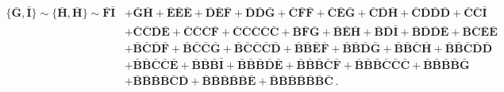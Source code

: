 \documentclass[10pt]{amsart}
\theoremstyle{definition}
\theoremstyle{corollary}
\theoremstyle{remark}
\theoremstyle{conclusion}
\begin{document}
\begin{align}
	\{\bar{\mathbf{G}}, \bar{\mathbf{I}}\} \sim \{\bar{\mathbf{H}}, \bar{\mathbf{H}}\} \sim \bar{\mathbf{F}}\bar{\mathbf{I}}&+\bar{\mathbf{G}}\bar{\mathbf{H}}+\bar{\mathbf{E}}\bar{\mathbf{E}}\bar{\mathbf{E}}+\bar{\mathbf{D}}\bar{\mathbf{E}}\bar{\mathbf{F}}+\bar{\mathbf{D}}\bar{\mathbf{D}}\bar{\mathbf{G}}+\bar{\mathbf{C}}\bar{\mathbf{F}}\bar{\mathbf{F}}+\bar{\mathbf{C}}\bar{\mathbf{E}}\bar{\mathbf{G}}+\bar{\mathbf{C}}\bar{\mathbf{D}}\bar{\mathbf{H}}+\bar{\mathbf{C}}\bar{\mathbf{D}}\bar{\mathbf{D}}\bar{\mathbf{D}}+\bar{\mathbf{C}}\bar{\mathbf{C}}\bar{\mathbf{I}}\nonumber \\
	&+\bar{\mathbf{C}}\bar{\mathbf{C}}\bar{\mathbf{D}}\bar{\mathbf{E}}+\bar{\mathbf{C}}\bar{\mathbf{C}}\bar{\mathbf{C}}\bar{\mathbf{F}}+\bar{\mathbf{C}}\bar{\mathbf{C}}\bar{\mathbf{C}}\bar{\mathbf{C}}\bar{\mathbf{C}}+\bar{\mathbf{B}}\bar{\mathbf{F}}\bar{\mathbf{G}}+\bar{\mathbf{B}}\bar{\mathbf{E}}\bar{\mathbf{H}}+\bar{\mathbf{B}}\bar{\mathbf{D}}\bar{\mathbf{I}}+\bar{\mathbf{B}}\bar{\mathbf{D}}\bar{\mathbf{D}}\bar{\mathbf{E}}+\bar{\mathbf{B}}\bar{\mathbf{C}}\bar{\mathbf{E}}\bar{\mathbf{E}}\nonumber \\
	&+\bar{\mathbf{B}}\bar{\mathbf{C}}\bar{\mathbf{D}}\bar{\mathbf{F}}+\bar{\mathbf{B}}\bar{\mathbf{C}}\bar{\mathbf{C}}\bar{\mathbf{G}}+\bar{\mathbf{B}}\bar{\mathbf{C}}\bar{\mathbf{C}}\bar{\mathbf{C}}\bar{\mathbf{D}}+\bar{\mathbf{B}}\bar{\mathbf{B}}\bar{\mathbf{E}}\bar{\mathbf{F}}+\bar{\mathbf{B}}\bar{\mathbf{B}}\bar{\mathbf{D}}\bar{\mathbf{G}}+\bar{\mathbf{B}}\bar{\mathbf{B}}\bar{\mathbf{C}}\bar{\mathbf{H}}+\bar{\mathbf{B}}\bar{\mathbf{B}}\bar{\mathbf{C}}\bar{\mathbf{D}}\bar{\mathbf{D}}\nonumber \\
	&+\bar{\mathbf{B}}\bar{\mathbf{B}}\bar{\mathbf{C}}\bar{\mathbf{C}}\bar{\mathbf{E}}+\bar{\mathbf{B}}\bar{\mathbf{B}}\bar{\mathbf{B}}\bar{\mathbf{I}}+\bar{\mathbf{B}}\bar{\mathbf{B}}\bar{\mathbf{B}}\bar{\mathbf{D}}\bar{\mathbf{E}}+\bar{\mathbf{B}}\bar{\mathbf{B}}\bar{\mathbf{B}}\bar{\mathbf{C}}\bar{\mathbf{F}}+\bar{\mathbf{B}}\bar{\mathbf{B}}\bar{\mathbf{B}}\bar{\mathbf{C}}\bar{\mathbf{C}}\bar{\mathbf{C}}+\bar{\mathbf{B}}\bar{\mathbf{B}}\bar{\mathbf{B}}\bar{\mathbf{B}}\bar{\mathbf{G}}\nonumber \\
	&+\bar{\mathbf{B}}\bar{\mathbf{B}}\bar{\mathbf{B}}\bar{\mathbf{B}}\bar{\mathbf{C}}\bar{\mathbf{D}}+\bar{\mathbf{B}}\bar{\mathbf{B}}\bar{\mathbf{B}}\bar{\mathbf{B}}\bar{\mathbf{B}}\bar{\mathbf{E}}+\bar{\mathbf{B}}\bar{\mathbf{B}}\bar{\mathbf{B}}\bar{\mathbf{B}}\bar{\mathbf{B}}\bar{\mathbf{B}}\bar{\mathbf{C}} \, .
\end{align}
\end{document}
